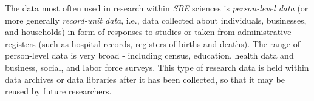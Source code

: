 \documentclass{llncs}
\begin{document}

The data most often used in research within \emph{SBE} sciences is \emph{person-level data} (or more generally \emph{record-unit data}, i.e., data collected about individuals, businesses, and households) in form of responses to studies or taken from administrative registers
(such as hospital records, registers of births and deaths). 
The range of person-level data is very broad - 
including census, education, health data and business, social, and labor force surveys.  
This type of research data is
held within data archives or data libraries after it has been collected, so that it may be
reused by future researchers. 
\end{document}
